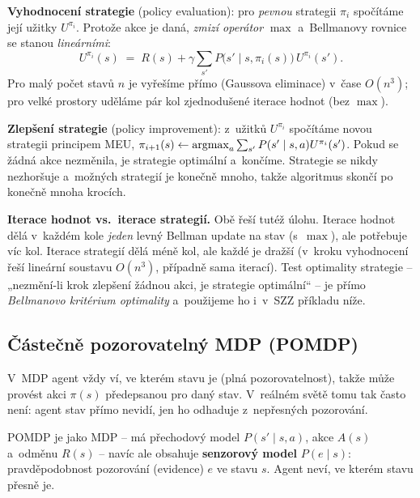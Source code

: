 \begin{intuice}
\textbf{Vyhodnocení strategie} (policy evaluation): pro \emph{pevnou} strategii $\pi_i$ spočítáme její užitky $U^{\pi_i}$. Protože akce je daná, \emph{zmizí operátor} $\max$ a~Bellmanovy rovnice se stanou \emph{lineárními}:
\[
  U^{\pi_i}(s) \;=\; R(s) + \gamma \sum_{s'} P\big(s'\mid s,\pi_i(s)\big)\, U^{\pi_i}(s').
\]
Pro malý počet stavů $n$ je vyřešíme přímo (Gaussova eliminace) v~čase $O(n^3)$; pro velké prostory uděláme pár kol zjednodušené iterace hodnot (bez $\max$).

\textbf{Zlepšení strategie} (policy improvement): z~užitků $U^{\pi_i}$ spočítáme novou strategii principem MEU, $\pi_{i+1}(s)\leftarrow\operatorname*{argmax}_a\sum_{s'}P(s'\mid s,a)U^{\pi_i}(s')$. Pokud se žádná akce nezměnila, je strategie optimální a~končíme. Strategie se nikdy nezhoršuje a~možných strategií je konečně mnoho, takže algoritmus skončí po konečně mnoha krocích.
\end{intuice}

\begin{poznamka}
\textbf{Iterace hodnot vs.\ iterace strategií.} Obě řeší tutéž úlohu. Iterace hodnot dělá v~každém kole \emph{jeden} levný Bellman update na stav (s~$\max$), ale potřebuje víc kol. Iterace strategií dělá méně kol, ale každé je dražší (v~kroku vyhodnocení řeší lineární soustavu $O(n^3)$, případně sama iterací). Test optimality strategie -- „nezmění-li krok zlepšení žádnou akci, je strategie optimální`` -- je přímo \emph{Bellmanovo kritérium optimality} a~použijeme ho i~v~SZZ příkladu níže.
\end{poznamka}

\subsection{Částečně pozorovatelný MDP (POMDP)}

V~MDP agent vždy ví, ve kterém stavu je (plná pozorovatelnost), takže může provést akci $\pi(s)$ předepsanou pro daný stav. V~reálném světě tomu tak často není: agent stav přímo nevidí, jen ho odhaduje z~nepřesných pozorování.

\begin{definice}
POMDP je jako MDP -- má přechodový model $P(s'\mid s,a)$, akce $A(s)$ a~odměnu $R(s)$ -- navíc ale obsahuje \textbf{senzorový model} $P(e\mid s)$: pravděpodobnost pozorování (evidence) $e$ ve stavu $s$. Agent neví, ve kterém stavu přesně je.
\end{definice}

